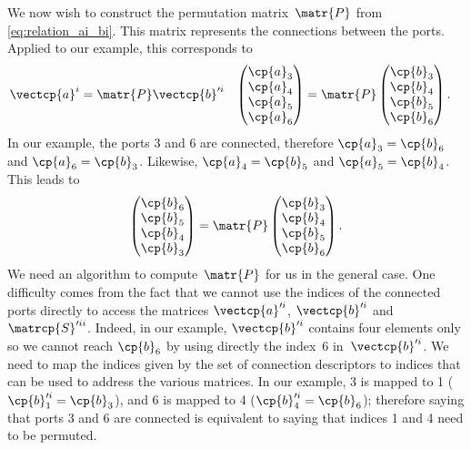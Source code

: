 We now wish to construct the permutation matrix~$\matr{P}$ from \cref{eq:relation_ai_bi}.
This matrix represents the connections between the ports.
Applied to our example, this corresponds to
\begin{align}
    \vectcp{a}^i
    &=
    \matr{P} \vectcp{b}'^i
    &
    \begin{pmatrix}
        \cp{a}_3 \\ \cp{a}_4 \\ \cp{a}_5 \\ \cp{a}_6
    \end{pmatrix}
    &=
    \matr{P}
    \begin{pmatrix}
        \cp{b}_3 \\ \cp{b}_4 \\ \cp{b}_5 \\ \cp{b}_6
    \end{pmatrix}
    \text{.}
    \label{eq:relation_ai_bi_example}
\end{align}
In our example, the ports 3 and 6 are connected,
therefore $\cp{a}_3 = \cp{b}_6$ and $\cp{a}_6 = \cp{b}_3$.
Likewise, $\cp{a}_4=\cp{b}_5$ and $\cp{a}_5=\cp{b}_4$.
This leads to
\begin{equation}
    \begin{pmatrix}
        \cp{b}_6 \\ \cp{b}_5 \\ \cp{b}_4 \\ \cp{b}_3
    \end{pmatrix}
    =
    \matr{P}
    \begin{pmatrix}
        \cp{b}_3 \\ \cp{b}_4 \\ \cp{b}_5 \\ \cp{b}_6
    \end{pmatrix}
    \text{.}
    \label{eq:relation_bi_bi_example}
\end{equation}
We need an algorithm to compute~$\matr{P}$ for us in the general case.
One difficulty comes from the fact that we cannot use the indices of the connected ports directly to access the matrices $\vectcp{a}'^i$, $\vectcp{b}'^i$ and $\matrcp{S}'^{ii}$.
Indeed, in our example, $\vectcp{b}'^i$ contains four elements only so we cannot reach $\cp{b}_6$ by using directly the index~6 in~$\vectcp{b}'^i$.
We need to map the indices given by the set of connection descriptors to indices that can be used to address the various matrices.
In our example, 3 is mapped to 1 ($\cp{b}'^i_1 = \cp{b}_3$), and 6 is mapped to 4 ($\cp{b}'^i_4 = \cp{b}_6$); therefore saying that ports 3 and 6 are connected is equivalent to saying that indices 1 and 4 need to be permuted.
